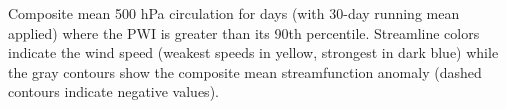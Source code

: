 \label{fig:pwi_spatial_summary}
Composite mean 500 hPa circulation for days (with 30-day running mean applied) where the PWI is greater than its 90th percentile. Streamline colors indicate the wind speed (weakest speeds in yellow, strongest in dark blue) while the gray contours show the composite mean streamfunction anomaly (dashed contours indicate negative values). 
